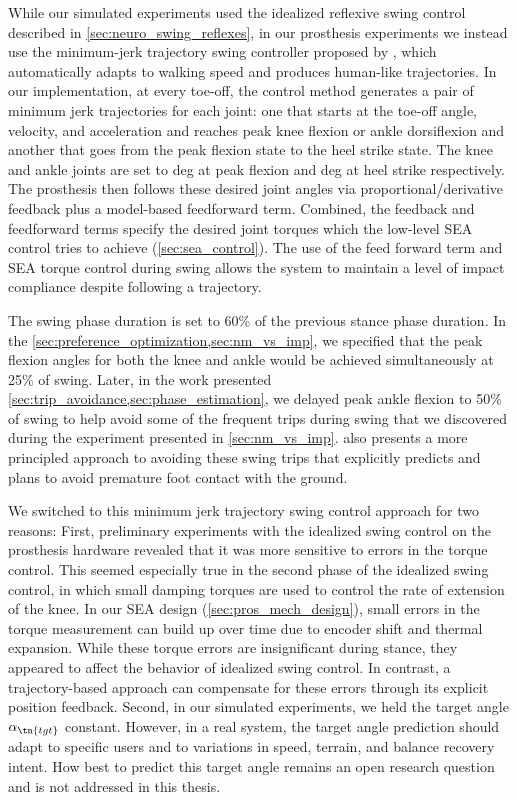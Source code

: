 While our simulated experiments used the idealized reflexive swing control
described in \cref{sec:neuro_swing_reflexes}, in our prosthesis experiments we
instead use the minimum-jerk trajectory swing controller proposed by
\citet{lenzi2014speed}, which automatically adapts to walking speed and produces
human-like trajectories. In our implementation, at every toe-off, the control
method generates a pair of minimum jerk trajectories for each joint: one that
starts at the toe-off angle, velocity, and acceleration and reaches peak knee
flexion or ankle dorsiflexion and another that goes from the peak flexion state
to the heel strike state. The knee and ankle joints are set to \unit[65 and
2]{deg} at peak flexion and \unit[2 and -5]{deg} at heel strike respectively.
The prosthesis then follows these desired joint angles via
proportional/derivative feedback plus a model-based feedforward term. Combined,
the feedback and feedforward terms specify the desired joint torques which the
low-level SEA control tries to achieve (\cref{sec:sea_control}). The use of the
feed forward term and SEA torque control during swing allows the system to
maintain a level of impact compliance despite following a trajectory.

The swing phase duration is set to 60\% of the previous stance phase duration.
In the \cref{sec:preference_optimization,sec:nm_vs_imp}, we specified that the
peak flexion angles for both the knee and ankle would be achieved simultaneously
at 25\% of swing. Later, in the work presented
\cref{sec:trip_avoidance,sec:phase_estimation}, we delayed peak ankle flexion to
50\% of swing to help avoid some of the frequent trips during swing that we
discovered during the experiment presented in \cref{sec:nm_vs_imp}.
 also presents a more principled approach to avoiding
these swing trips that explicitly predicts and plans to avoid premature foot
contact with the ground.

We switched to this minimum jerk trajectory swing control approach for two
reasons: First, preliminary experiments with the idealized swing control on the
prosthesis hardware revealed that it was more sensitive to errors in the torque
control. This seemed especially true in the second phase of the idealized swing
control, in which small damping torques are used to control the rate of
extension of the knee. In our SEA design (\cref{sec:pros_mech_design}), small
errors in the torque measurement can build up over time due to encoder shift and
thermal expansion.  While these torque errors are insignificant during stance,
they appeared to affect the behavior of idealized swing control. In contrast, a
trajectory-based approach can compensate for these errors through its explicit
position feedback. Second, in our simulated experiments, we held the target
angle $\alpha_\tn{tgt}$ constant. However, in a real system, the target angle
prediction should adapt to specific users and to variations in speed, terrain,
and balance recovery intent. How best to predict this target angle remains an
open research question and is not addressed in this thesis.

